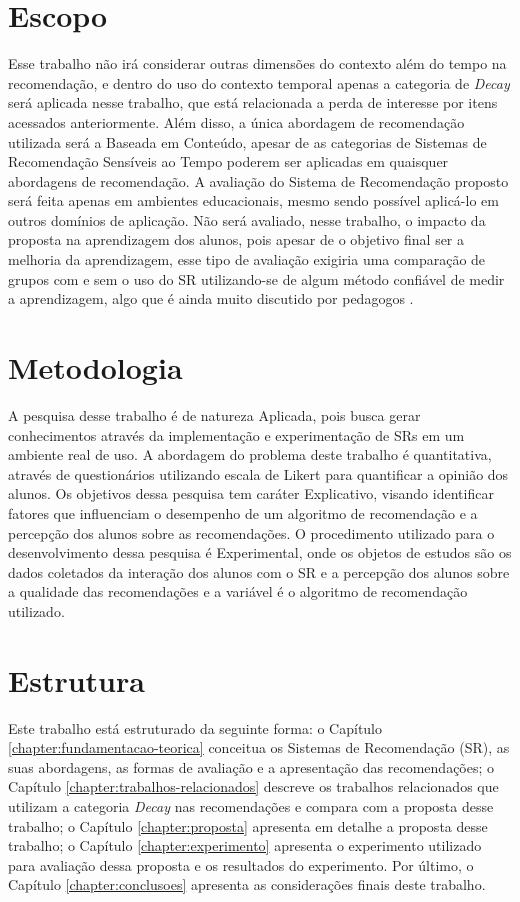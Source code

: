 \section{Escopo}

Esse trabalho não irá considerar outras dimensões do contexto além do tempo na recomendação, e dentro do uso do contexto
temporal apenas a categoria de \textit{Decay} será aplicada nesse trabalho, que está relacionada a perda de interesse por
itens acessados anteriormente. Além disso, a única abordagem de recomendação utilizada será a Baseada em Conteúdo,
apesar de as categorias de Sistemas de Recomendação Sensíveis ao Tempo poderem ser aplicadas em quaisquer abordagens de
recomendação. A avaliação do Sistema de Recomendação proposto será feita apenas em ambientes educacionais, mesmo sendo
possível aplicá-lo em outros domínios de aplicação. Não será avaliado, nesse trabalho, o impacto da proposta na
aprendizagem dos alunos, pois apesar de o objetivo final ser a melhoria da aprendizagem, esse tipo de avaliação exigiria uma
comparação de grupos com e sem o uso do SR utilizando-se de algum método confiável de medir a
aprendizagem, algo que é ainda muito discutido por pedagogos \cite{luckesi2014avaliaccao}.

\section{Metodologia}

A pesquisa desse trabalho é de natureza Aplicada, pois busca gerar conhecimentos através da implementação e experimentação
de SRs em um ambiente real de uso. A abordagem do problema deste trabalho é quantitativa, através de questionários utilizando
escala de Likert para quantificar a opinião dos alunos. Os objetivos dessa pesquisa tem caráter Explicativo, visando
identificar fatores que influenciam o desempenho de um algoritmo de recomendação e a percepção dos alunos sobre as
recomendações. O procedimento utilizado para o desenvolvimento dessa pesquisa é Experimental, onde os objetos de estudos são
os dados coletados da interação dos alunos com o SR e a percepção dos alunos sobre a qualidade das recomendações e a
variável é o algoritmo de recomendação utilizado.

\section{Estrutura}

Este trabalho está estruturado da seguinte forma: o Capítulo \ref{chapter:fundamentacao-teorica} conceitua os Sistemas de
Recomendação (SR), as suas abordagens, as formas de avaliação e a apresentação das recomendações; o Capítulo \ref{chapter:trabalhos-relacionados}
descreve os trabalhos relacionados que utilizam a categoria \textit{Decay} nas recomendações e compara com a proposta desse
trabalho; o Capítulo \ref{chapter:proposta} apresenta em detalhe a proposta desse trabalho; o Capítulo \ref{chapter:experimento}
apresenta o experimento utilizado para avaliação dessa proposta e os resultados do experimento. Por último, o Capítulo \ref{chapter:conclusoes} apresenta
as considerações finais deste trabalho.


